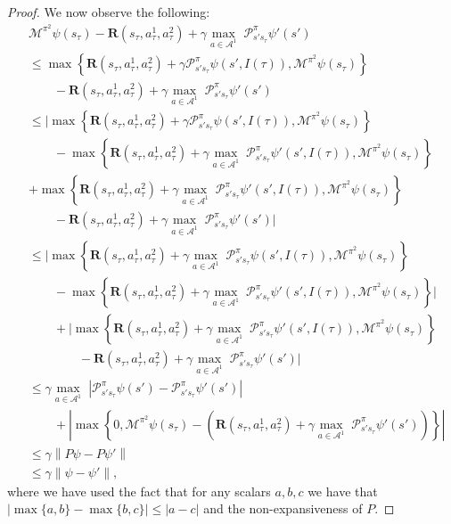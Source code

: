 \documentclass[12pt]{article}
\newtheorem{proof}{Proof}
\begin{document}
\begin{proof}
We now observe the following:
\begin{align*}
&\mathcal{M}^{\pi^2}\psi(s_{\tau})-\boldsymbol{R}(s_\tau,a^1_\tau,a^2_\tau)+\gamma\underset{a\in\mathcal{A}^1}{\max}\;\mathcal{P}^\pi_{s's_\tau}\psi'(s')
\\&\leq\max\left\{\boldsymbol{R}(s_\tau,a^1_\tau,a^2_\tau)+\gamma\mathcal{P}^\pi_{s's_\tau}\psi(s',I({\tau})),\mathcal{M}^{\pi^2}\psi(s_{\tau})\right\}
\\&\qquad-\boldsymbol{R}(s_\tau,a^1_\tau,a^2_\tau)+\gamma\underset{a\in\mathcal{A}^1}{\max}\;\mathcal{P}^\pi_{s's_\tau}\psi'(s')
\\&\leq \Bigg|\max\left\{\boldsymbol{R}(s_\tau,a^1_\tau,a^2_\tau)+\gamma\mathcal{P}^\pi_{s's_\tau}\psi(s',I({\tau})),\mathcal{M}^{\pi^2}\psi(s_{\tau})\right\}
\\&\qquad-\max\left\{\boldsymbol{R}(s_\tau,a^1_\tau,a^2_\tau)+\gamma\underset{a\in\mathcal{A}^1}{\max}\;\mathcal{P}^\pi_{s's_\tau}\psi'(s',I({\tau})),\mathcal{M}^{\pi^2}\psi(s_{\tau})\right\}
\\&+\max\left\{\boldsymbol{R}(s_\tau,a^1_\tau,a^2_\tau)+\gamma\underset{a\in\mathcal{A}^1}{\max}\;\mathcal{P}^\pi_{s's_\tau}\psi'(s',I({\tau})),\mathcal{M}^{\pi^2}\psi(s_{\tau})\right\}
\\&\qquad-\boldsymbol{R}(s_\tau,a^1_\tau,a^2_\tau)+\gamma\underset{a\in\mathcal{A}^1}{\max}\;\mathcal{P}^\pi_{s's_\tau}\psi'(s')\Bigg|
\\&\leq \Bigg|\max\left\{\boldsymbol{R}(s_\tau,a^1_\tau,a^2_\tau)+\gamma\underset{a\in\mathcal{A}^1}{\max}\;\mathcal{P}^\pi_{s's_\tau}\psi(s',I({\tau})),\mathcal{M}^{\pi^2}\psi(s_{\tau})\right\}
\\&\qquad-\max\left\{\boldsymbol{R}(s_\tau,a^1_\tau,a^2_\tau)+\gamma\underset{a\in\mathcal{A}^1}{\max}\;\mathcal{P}^\pi_{s's_\tau}\psi'(s',I({\tau})),\mathcal{M}^{\pi^2}\psi(s_{\tau})\right\}\Bigg|
\\&\qquad+\Bigg|\max\left\{\boldsymbol{R}(s_\tau,a^1_\tau,a^2_\tau)+\gamma\underset{a\in\mathcal{A}^1}{\max}\;\mathcal{P}^\pi_{s's_\tau}\psi'(s',I({\tau})),\mathcal{M}^{\pi^2}\psi(s_{\tau})\right\}\\&\qquad\qquad-\boldsymbol{R}(s_\tau,a^1_\tau,a^2_\tau)+\gamma\underset{a\in\mathcal{A}^1}{\max}\;\mathcal{P}^\pi_{s's_\tau}\psi'(s')\Bigg|
\\&\leq \gamma\underset{a\in\mathcal{A}^1}{\max}\;\left|\mathcal{P}^\pi_{s's_\tau}\psi(s')-\mathcal{P}^\pi_{s's_\tau}\psi'(s')\right|
\\&\qquad+\left|\max\left\{0,\mathcal{M}^{\pi^2}\psi(s_{\tau})-\left(\boldsymbol{R}(s_\tau,a^1_\tau,a^2_\tau)+\gamma\underset{a\in\mathcal{A}^1}{\max}\;\mathcal{P}^\pi_{s's_\tau}\psi'(s')\right)\right\}\right|
\\&\leq \gamma\left\|P\psi-P\psi'\right\|
\\&\leq \gamma\|\psi-\psi'\|,
\end{align*}
where we have used the fact that for any scalars $a,b,c$ we have that $
    \left|\max\{a,b\}-\max\{b,c\}\right|\leq \left|a-c\right|$ and the non-expansiveness of $P$.




\end{proof}
\end{document}
